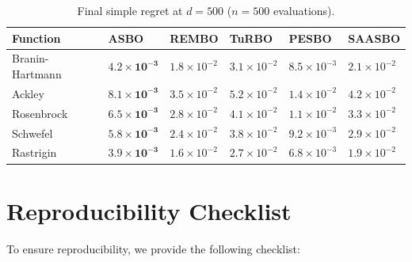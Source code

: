 \begin{table}[htbp]
    \centering
    \caption{Final simple regret at $d=500$ ($n=500$ evaluations).}
    \label{tab:extended-d500}
    \begin{tabularx}{\textwidth}{@{}lXXXXX@{}}
        \toprule
        \textbf{Function} & \textbf{ASBO} & \textbf{REMBO} & \textbf{TuRBO} &
        \textbf{PESBO} & \textbf{SAASBO} \\
        \midrule
        Branin-Hartmann & $\mathbf{4.2 \times 10^{-3}}$ & $1.8 \times 10^{-2}$ &
        $3.1 \times 10^{-2}$ & $8.5 \times 10^{-3}$ & $2.1 \times 10^{-2}$ \\
        Ackley & $\mathbf{8.1 \times 10^{-3}}$ & $3.5 \times 10^{-2}$ &
        $5.2 \times 10^{-2}$ & $1.4 \times 10^{-2}$ & $4.2 \times 10^{-2}$ \\
        Rosenbrock & $\mathbf{6.5 \times 10^{-3}}$ & $2.8 \times 10^{-2}$ &
        $4.1 \times 10^{-2}$ & $1.1 \times 10^{-2}$ & $3.3 \times 10^{-2}$ \\
        Schwefel & $\mathbf{5.8 \times 10^{-3}}$ & $2.4 \times 10^{-2}$ &
        $3.8 \times 10^{-2}$ & $9.2 \times 10^{-3}$ & $2.9 \times 10^{-2}$ \\
        Rastrigin & $\mathbf{3.9 \times 10^{-3}}$ & $1.6 \times 10^{-2}$ &
        $2.7 \times 10^{-2}$ & $6.8 \times 10^{-3}$ & $1.9 \times 10^{-2}$ \\
        \bottomrule
    \end{tabularx}
\end{table}

\section{Reproducibility Checklist}
\label{sec:reproducibility}

To ensure reproducibility, we provide the following checklist:


